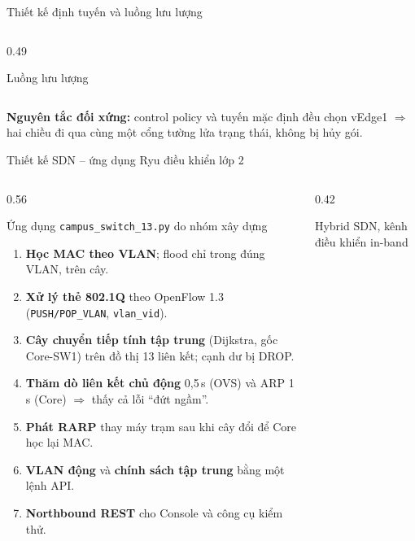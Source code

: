 \documentclass[aspectratio=169, 10pt, xcolor={table}]{beamer}
\newcommand{\compactlist}{\setlength{\itemsep}{1pt}\setlength{\parskip}{0pt}}
\begin{document}
\begin{frame}{Thiết kế định tuyến và luồng lưu lượng}
\begin{columns}[T]
\begin{column}{0.49\textwidth}
\begin{card}[accent]{Luồng lưu lượng}
\begin{itemize}
                \end{itemize}
            \end{card}
        \end{column}
    \end{columns}
    \vspace{-0.05cm}
    \begin{softcard}\scriptsize
        \textbf{\color{brand}Nguyên tắc đối xứng:} control policy và tuyến mặc định đều chọn vEdge1 $\Rightarrow$ hai chiều đi qua cùng một cổng tường lửa trạng thái, không bị hủy gói.
    \end{softcard}
\end{frame}

\begin{frame}{Thiết kế SDN -- ứng dụng Ryu điều khiển lớp 2}
    \begin{columns}[T]
        \begin{column}{0.56\textwidth}
            \begin{card}{Ứng dụng \texttt{campus\_switch\_13.py} do nhóm xây dựng}
                \scriptsize
                \begin{enumerate}\compactlist
                    \item \textbf{Học MAC theo VLAN}; flood chỉ trong đúng VLAN, trên cây.
                    \item \textbf{Xử lý thẻ 802.1Q} theo OpenFlow 1.3 (\texttt{PUSH/POP\_VLAN}, \texttt{vlan\_vid}).
                    \item \textbf{Cây chuyển tiếp tính tập trung} (Dijkstra, gốc Core-SW1) trên đồ thị 13 liên kết; cạnh dư bị DROP.
                    \item \textbf{Thăm dò liên kết chủ động} 0,5\,s (OVS) và ARP 1\,s (Core) $\Rightarrow$ thấy cả lỗi ``đứt ngầm''.
                    \item \textbf{Phát RARP} thay máy trạm sau khi cây đổi để Core học lại MAC.
                    \item \textbf{VLAN động} và \textbf{chính sách tập trung} bằng một lệnh API.
                    \item \textbf{Northbound REST} cho Console và công cụ kiểm thử.
                \end{enumerate}
            \end{card}
        \end{column}
        \begin{column}{0.42\textwidth}
            \begin{card}[accent]{Hybrid SDN, kênh điều khiển in-band}

\end{card}
\end{column}
\end{columns}
\end{frame}
\end{document}

